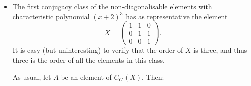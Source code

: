 \documentclass[11pt]{article} \usepackage{amssymb}
\begin{document}
\begin{enumerate}
\begin{enumerate}
\begin{itemize}
      \item
        The first conjugacy class of the non-diagonalisable elements with 
        characteristic polynomial
        $(x+2)^3$ has as representative the element
        \begin{equation*}
          X=
          \begin{pmatrix}
            1&1  &0 \\ 
            0&1  &1 \\ 
            0&0  &1 
          \end{pmatrix}.
        \end{equation*}
        It is easy (but uninteresting) to verify that the order of $X$ is
        three, and thus three is the order of all the elements in this class.
        
        As usual, let $A$ be an element of $C_G(X)$. Then:
        

\end{itemize}
\end{enumerate}
\end{enumerate}
\end{document}
